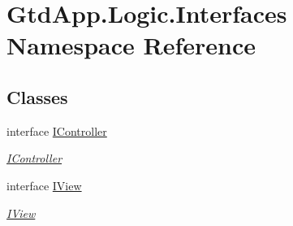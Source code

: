 \hypertarget{namespace_gtd_app_1_1_logic_1_1_interfaces}{}\section{Gtd\+App.\+Logic.\+Interfaces Namespace Reference}
\label{namespace_gtd_app_1_1_logic_1_1_interfaces}
\subsection*{Classes}
\begin{DoxyCompactItemize}
\item 
interface \mbox{\hyperlink{interface_gtd_app_1_1_logic_1_1_interfaces_1_1_i_controller}{I\+Controller}}
\begin{DoxyCompactList}\small\item\em \mbox{\hyperlink{interface_gtd_app_1_1_logic_1_1_interfaces_1_1_i_controller}{I\+Controller}} \end{DoxyCompactList}\item 
interface \mbox{\hyperlink{interface_gtd_app_1_1_logic_1_1_interfaces_1_1_i_view}{I\+View}}
\begin{DoxyCompactList}\small\item\em \mbox{\hyperlink{interface_gtd_app_1_1_logic_1_1_interfaces_1_1_i_view}{I\+View}} \end{DoxyCompactList}\end{DoxyCompactItemize}
